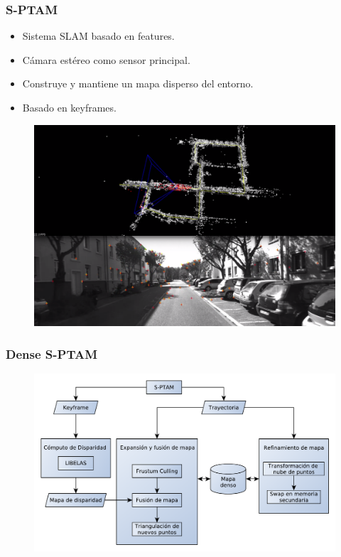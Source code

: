 \documentclass[compress]{beamer}
\begin{document}
\begin{frame}
\frametitle{S-PTAM}

\begin{itemize}
\item Sistema SLAM basado en features.
\item Cámara estéreo como sensor principal.
\item Construye y mantiene un mapa disperso del entorno.
\item Basado en keyframes.
\end{itemize}

\begin{figure}[htb]
	\centering
	\includegraphics[width=0.8\columnwidth]{method/sptam_kitti.png}
\end{figure}

\end{frame}


\begin{frame}

\frametitle{Dense S-PTAM}
\begin{figure}[htb]
	\centering
	\includegraphics[width=1.0\columnwidth]{method/metodo-diagram.pdf}
	\hfill
\end{figure}

\end{frame}
\end{document}
